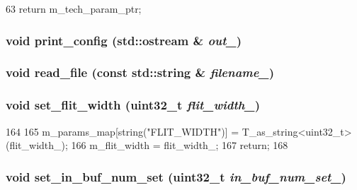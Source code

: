 \begin{DoxyCode}
63 { return m_tech_param_ptr; }
\end{DoxyCode}
\hypertarget{classOrionConfig_acf691ca359ff52cb80926b35bfe521d4}{
\subsubsection[{print\_\-config}]{\setlength{\rightskip}{0pt plus 5cm}void print\_\-config (std::ostream \& {\em out\_\-})}}
\label{classOrionConfig_acf691ca359ff52cb80926b35bfe521d4}
\hypertarget{classOrionConfig_ae66e7cfdc93c26b8c84d7eb881574790}{
\subsubsection[{read\_\-file}]{\setlength{\rightskip}{0pt plus 5cm}void read\_\-file (const std::string \& {\em filename\_\-})}}
\label{classOrionConfig_ae66e7cfdc93c26b8c84d7eb881574790}
\hypertarget{classOrionConfig_a6a6e29cab117592186f44820cc7b9017}{
\subsubsection[{set\_\-flit\_\-width}]{\setlength{\rightskip}{0pt plus 5cm}void set\_\-flit\_\-width ({\bf uint32\_\-t} {\em flit\_\-width\_\-})}}
\label{classOrionConfig_a6a6e29cab117592186f44820cc7b9017}



\begin{DoxyCode}
164 {
165     m_params_map[string("FLIT_WIDTH")] = T_as_string<uint32_t>(flit_width_);
166     m_flit_width = flit_width_;
167     return;
168 }
\end{DoxyCode}
\hypertarget{classOrionConfig_ada66b5944babcae7eab2d48832fc4700}{
\subsubsection[{set\_\-in\_\-buf\_\-num\_\-set}]{\setlength{\rightskip}{0pt plus 5cm}void set\_\-in\_\-buf\_\-num\_\-set ({\bf uint32\_\-t} {\em in\_\-buf\_\-num\_\-set\_\-})}}
\label{classOrionConfig_ada66b5944babcae7eab2d48832fc4700}



